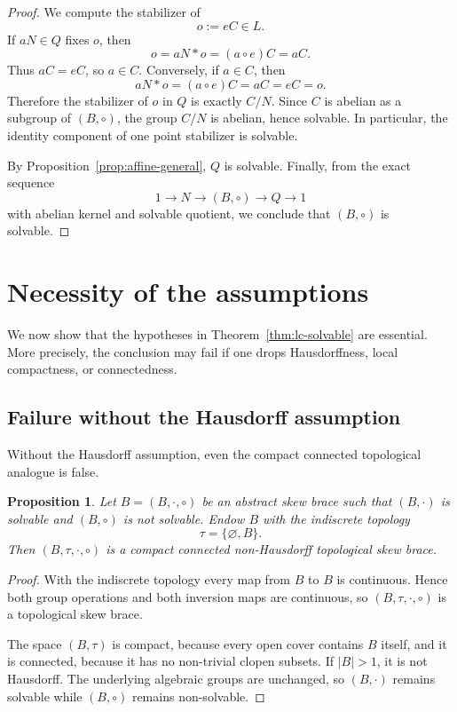 \documentclass[reqno]{amsart}
\numberwithin{equation}{section}
\newtheorem{proposition}[theorem]{Proposition}
\theoremstyle{definition}
\theoremstyle{remark}
\begin{document}
\begin{proof}
We compute the stabilizer of
\[
o:=eC\in L.
\]
If \(aN\in Q\) fixes \(o\), then
\[
o=aN\ast o=(a\circ e)C=aC.
\]
Thus \(aC=eC\), so \(a\in C\). Conversely, if \(a\in C\), then
\[
aN\ast o=(a\circ e)C=aC=eC=o.
\]
Therefore the stabilizer of \(o\) in \(Q\) is exactly \(C/N\). Since \(C\) is
abelian as a subgroup of \((B,\circ)\), the group \(C/N\) is abelian, hence
solvable. In particular, the identity component of one point stabilizer is
solvable.

By Proposition~\ref{prop:affine-general}, \(Q\) is solvable. Finally, from the
exact sequence
\[
1\longrightarrow N
\longrightarrow (B,\circ)
\longrightarrow Q
\longrightarrow 1
\]
with abelian kernel and solvable quotient, we conclude that \((B,\circ)\) is
solvable.
\end{proof}


\section{Necessity of the assumptions}\label{sec:necessity}

We now show that the hypotheses in Theorem~\ref{thm:lc-solvable} are essential.
More precisely, the conclusion may fail if one drops Hausdorffness, local
compactness, or connectedness.

\subsection{Failure without the Hausdorff assumption}\label{subsec:non-hausdorff}

Without the Hausdorff assumption, even the compact connected topological
analogue is false.

\begin{proposition}\label{prop:indiscrete}
Let $B=(B,\cdot,\circ)$ be an abstract skew brace such that $(B,\cdot)$ is
solvable and $(B,\circ)$ is not solvable. Endow $B$ with the indiscrete
topology
\[
\tau=\{\varnothing,B\}.
\]
Then $(B,\tau,\cdot,\circ)$ is a compact connected non-Hausdorff topological
skew brace.
\end{proposition}

\begin{proof}
With the indiscrete topology every map from $B$ to $B$ is continuous. Hence both
group operations and both inversion maps are continuous, so
$(B,\tau,\cdot,\circ)$ is a topological skew brace.

The space $(B,\tau)$ is compact, because every open cover contains $B$ itself,
and it is connected, because it has no non-trivial clopen subsets. If
$|B|>1$, it is not Hausdorff. The underlying algebraic groups are unchanged, so
$(B,\cdot)$ remains solvable while $(B,\circ)$ remains non-solvable.
\end{proof}
\end{document}
